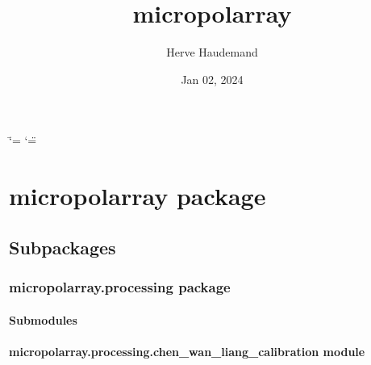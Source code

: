 \documentclass[letterpaper,10pt,english]{sphinxmanual}
\title{micropolarray}
\date{Jan 02, 2024}
\author{Herve Haudemand}
\begin{document}
\ifdefined\shorthandoff
  \ifnum\catcode`\=\string=\active\shorthandoff{=}\fi
  \ifnum\catcode`\"=\active{}\fi
\fi

\pagestyle{empty}
\sphinxmaketitle
\pagestyle{plain}
\sphinxtableofcontents
\pagestyle{normal}
\label{\detokenize{index::doc}}


\sphinxstepscope


\chapter{micropolarray package}
\label{\detokenize{micropolarray:micropolarray-package}}\label{\detokenize{micropolarray::doc}}

\section{Subpackages}
\label{\detokenize{micropolarray:subpackages}}
\sphinxstepscope


\subsection{micropolarray.processing package}
\label{\detokenize{micropolarray.processing:micropolarray-processing-package}}\label{\detokenize{micropolarray.processing::doc}}

\subsubsection{Submodules}
\label{\detokenize{micropolarray.processing:submodules}}

\subsubsection{micropolarray.processing.chen\_wan\_liang\_calibration module}
\label{\detokenize{micropolarray.processing:module-micropolarray.processing.chen_wan_liang_calibration}}\label{\detokenize{micropolarray.processing:micropolarray-processing-chen-wan-liang-calibration-module}}
\end{document}

